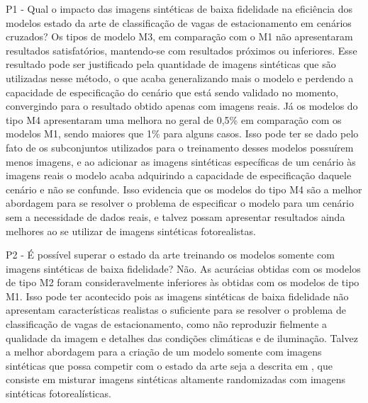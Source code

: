 P1 - Qual o impacto das imagens sintéticas de baixa fidelidade na eficiência dos modelos estado da arte de classificação de vagas de estacionamento em cenários cruzados? Os tipos de modelo M3, em comparação com o M1 não apresentaram resultados satisfatórios, mantendo-se com resultados próximos ou inferiores. Esse resultado pode ser justificado pela quantidade de imagens sintéticas que são utilizadas nesse método, o que acaba generalizando mais o modelo e perdendo a capacidade de especificação do cenário que está sendo validado no momento, convergindo para o resultado obtido apenas com imagens reais. Já os modelos do tipo M4 apresentaram uma melhora no geral de 0,5\% em comparação com os modelos M1, sendo maiores que 1\% para alguns casos. Isso pode ter se dado pelo fato de os subconjuntos utilizados para o treinamento desses modelos possuírem menos imagens, e ao adicionar as imagens sintéticas específicas de um cenário às imagens reais o modelo acaba adquirindo a capacidade de especificação daquele cenário e não se confunde. Isso evidencia que os modelos do tipo M4 são a melhor abordagem para se resolver o problema de especificar o modelo para um cenário sem a necessidade de dados reais, e talvez possam apresentar resultados ainda melhores ao se utilizar de imagens sintéticas fotorealistas.

P2 - É possível superar o estado da arte treinando os modelos somente com imagens sintéticas de baixa fidelidade? Não. As acurácias obtidas com os modelos de tipo M2 foram consideravelmente inferiores às obtidas com os modelos de tipo M1. Isso pode ter acontecido pois as imagens sintéticas de baixa fidelidade não apresentam características realistas o suficiente para se resolver o problema de classificação de vagas de estacionamento, como não reproduzir fielmente a qualidade da imagem e detalhes das condições climáticas e de iluminação. Talvez a melhor abordagem para a criação de um modelo somente com imagens sintéticas que possa competir com o estado da arte seja a descrita em \citet{objectPose}, que consiste em misturar imagens sintéticas altamente randomizadas com imagens sintéticas fotorealísticas.
